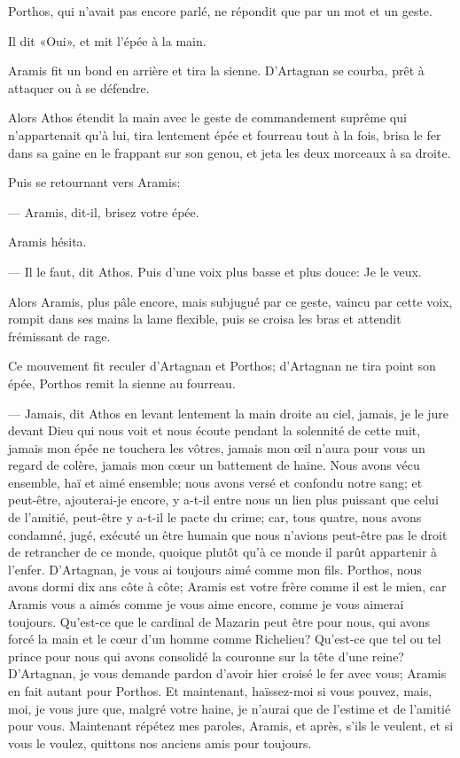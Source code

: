 Porthos, qui n'avait pas encore parlé, ne répondit que par un mot et un geste.

Il dit «Oui», et mit l'épée à la main.

Aramis fit un bond en arrière et tira la sienne. D'Artagnan se courba, prêt à attaquer ou à se défendre.

Alors Athos étendit la main avec le geste de commandement suprême qui n'appartenait qu'à lui, tira lentement épée et fourreau tout à la fois, brisa le fer dans sa gaine en le frappant sur son genou, et jeta les deux morceaux à sa droite.

Puis se retournant vers Aramis:

— Aramis, dit-il, brisez votre épée.

Aramis hésita.

— Il le faut, dit Athos. Puis d'une voix plus basse et plus douce: Je le veux.

Alors Aramis, plus pâle encore, mais subjugué par ce geste, vaincu par cette voix, rompit dans ses mains la lame flexible, puis se croisa les bras et attendit frémissant de rage.

Ce mouvement fit reculer d'Artagnan et Porthos; d'Artagnan ne tira point son épée, Porthos remit la sienne au fourreau.

— Jamais, dit Athos en levant lentement la main droite au ciel, jamais, je le jure devant Dieu qui nous voit et nous écoute pendant la solennité de cette nuit, jamais mon épée ne touchera les vôtres, jamais mon œil n'aura pour vous un regard de colère, jamais mon cœur un battement de haine. Nous avons vécu ensemble, haï et aimé ensemble; nous avons versé et confondu notre sang; et peut-être, ajouterai-je encore, y a-t-il entre nous un lien plus puissant que celui de l'amitié, peut-être y a-t-il le pacte du crime; car, tous quatre, nous avons condamné, jugé, exécuté un être humain que nous n'avions peut-être pas le droit de retrancher de ce monde, quoique plutôt qu'à ce monde il parût appartenir à l'enfer. D'Artagnan, je vous ai toujours aimé comme mon fils. Porthos, nous avons dormi dix ans côte à côte; Aramis est votre frère comme il est le mien, car Aramis vous a aimés comme je vous aime encore, comme je vous aimerai toujours. Qu'est-ce que le cardinal de Mazarin peut être pour nous, qui avons forcé la main et le cœur d'un homme comme Richelieu? Qu'est-ce que tel ou tel prince pour nous qui avons consolidé la couronne sur la tête d'une reine? D'Artagnan, je vous demande pardon d'avoir hier croisé le fer avec vous; Aramis en fait autant pour Porthos. Et maintenant, haïssez-moi si vous pouvez, mais, moi, je vous jure que, malgré votre haine, je n'aurai que de l'estime et de l'amitié pour vous. Maintenant répétez mes paroles, Aramis, et après, s'ils le veulent, et si vous le voulez, quittons nos anciens amis pour toujours.

